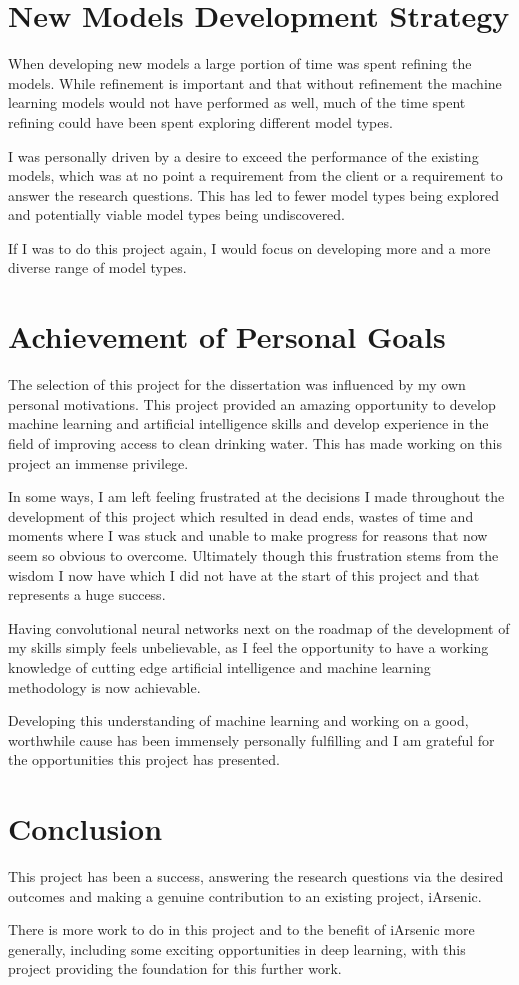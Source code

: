\section{New Models Development Strategy}

When developing new models a large portion of time was spent refining the models. While refinement is important and that without refinement the machine learning models would not have performed as well, much of the time spent refining could have been spent exploring different model types.

I was personally driven by a desire to exceed the performance of the existing models, which was at no point a requirement from the client or a requirement to answer the research questions. This has led to fewer model types being explored and potentially viable model types being undiscovered.

If I was to do this project again, I would focus on developing more and a more diverse range of model types.

\section{Achievement of Personal Goals}

The selection of this project for the dissertation was influenced by my own personal motivations. This project provided an amazing opportunity to develop machine learning and artificial intelligence skills and develop experience in the field of improving access to clean drinking water. This has made working on this project an immense privilege.

In some ways, I am left feeling frustrated at the decisions I made throughout the development of this project which resulted in dead ends, wastes of time and moments where I was stuck and unable to make progress for reasons that now seem so obvious to overcome. Ultimately though this frustration stems from the wisdom I now have which I did not have at the start of this project and that represents a huge success.

Having convolutional neural networks next on the roadmap of the development of my skills simply feels unbelievable, as I feel the opportunity to have a working knowledge of cutting edge artificial intelligence and machine learning methodology is now achievable.

Developing this understanding of machine learning and working on a good, worthwhile cause has been immensely personally fulfilling and I am grateful for the opportunities this project has presented.

\section{Conclusion}

This project has been a success, answering the research questions via the desired outcomes and making a genuine contribution to an existing project, iArsenic.

There is more work to do in this project and to the benefit of iArsenic more generally, including some exciting opportunities in deep learning, with this project providing the foundation for this further work.